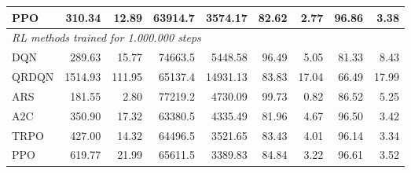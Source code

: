 \begin{samepage}
\begin{center}
\begin{tabular}{l|rr|rr|rr|rr}
    PPO          &   310.34 &    12.89 &    63914.7 &    3574.17 &   82.62 &    2.77 &   96.86 &    3.38 \\
    \midrule
    \multicolumn{9}{l}{\textit{RL methods trained for 1.000.000 steps}} \\
    \midrule
    DQN          &   289.63 &    15.77 &    74663.5 &    5448.58 &   96.49 &    5.05 &   81.33 &    8.43 \\
    QRDQN        &  1514.93 &   111.95 &    65137.4 &   14931.13 &   83.83 &   17.04 &   66.49 &   17.99 \\
    ARS          &   181.55 &     2.80 &    77219.2 &    4730.09 &   99.73 &    0.82 &   86.52 &    5.25 \\
    A2C          &   350.90 &    17.32 &    63380.5 &    4335.49 &   81.96 &    4.67 &   96.50 &    3.42 \\
    TRPO         &   427.00 &    14.32 &    64496.5 &    3521.65 &   83.43 &    4.01 &   96.14 &    3.34 \\
    PPO          &   619.77 &    21.99 &    65611.5 &    3389.83 &   84.84 &    3.22 &   96.61 &    3.52 \\
    \bottomrule
  \end{tabular}
\end{center}
\end{samepage}

